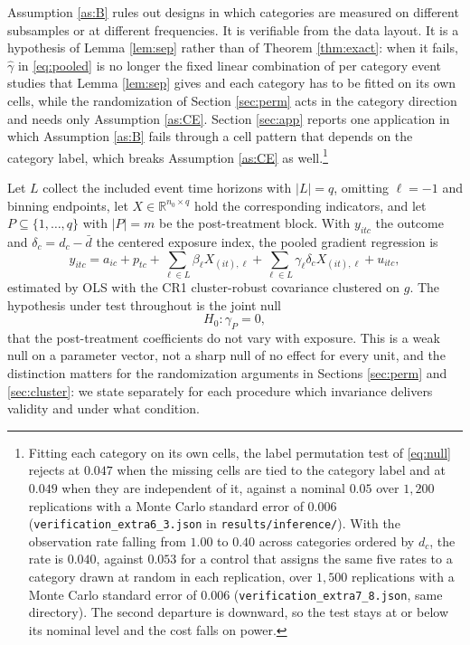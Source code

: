 \documentclass[12pt]{article}
\theoremstyle{definition}
\numberwithin{equation}{section}
\begin{document}
Assumption \ref{as:B} rules out designs in which categories are measured on
different subsamples or at different frequencies. It is verifiable from the data
layout. It is a hypothesis of Lemma \ref{lem:sep} rather than of Theorem
\ref{thm:exact}: when it fails, $\hat{\gamma}$ in \eqref{eq:pooled} is no longer
the fixed linear combination of per category event studies that Lemma
\ref{lem:sep} gives and each category has to be fitted on its own cells, while
the randomization of Section \ref{sec:perm} acts in the category direction and
needs only Assumption \ref{as:CE}. Section \ref{sec:app} reports one application in which
Assumption \ref{as:B} fails through a cell pattern that depends on the category
label, which breaks Assumption \ref{as:CE} as well.\footnote{Fitting each category on its own
cells, the label permutation test of \eqref{eq:null} rejects at $0.047$ when
the missing cells are tied to the category label and at $0.049$ when they are
independent of it, against a nominal $0.05$ over $1{,}200$ replications with a
Monte Carlo standard error of $0.006$
(\texttt{verification\_extra6\_3.json} in \texttt{results/inference/}). With the
observation rate falling from $1.00$ to $0.40$ across categories ordered by
$d_c$, the rate is $0.040$, against $0.053$ for a control that assigns the same
five rates to a category drawn at random in each replication, over $1{,}500$
replications with a Monte Carlo standard error of $0.006$
(\texttt{verification\_extra7\_8.json}, same directory). The second
departure is downward, so the test stays at or below its nominal level and the
cost falls on power.}

Let $L$ collect the included event time horizons with $|L| = q$, omitting
$\ell = -1$ and binning endpoints, let $X \in \mathbb{R}^{n_0 \times q}$ hold the
corresponding indicators, and let $P \subseteq \{1,\dots,q\}$ with $|P| = m$ be
the post-treatment block. With $y_{itc}$ the outcome and $\delta_c = d_c -
\bar{d}$ the centered exposure index, the pooled gradient regression is
\begin{equation}
y_{itc} = a_{ic} + p_{tc} + \sum_{\ell \in L} \beta_\ell X_{(it),\ell}
  + \sum_{\ell \in L} \gamma_\ell \delta_c X_{(it),\ell} + u_{itc},
\label{eq:pooled}
\end{equation}
estimated by OLS with the CR1 cluster-robust covariance clustered on $g$. The
hypothesis under test throughout is the joint null
\begin{equation}
H_0: \gamma_P = 0,
\label{eq:null}
\end{equation}
that the post-treatment coefficients do not vary with exposure. This is a weak
null on a parameter vector, not a sharp null of no effect for every unit, and
the distinction matters for the randomization arguments in Sections
\ref{sec:perm} and \ref{sec:cluster}: we state separately for each procedure
which invariance delivers validity and under what condition.
\end{document}
